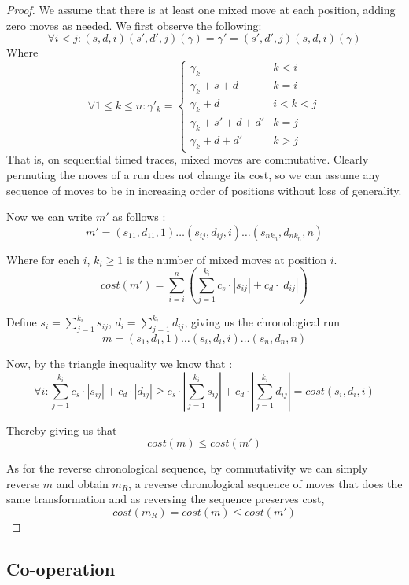 \documentclass[runningheads]{llncs}
\newcounter{cases}
\begin{document}
\begin{proof}
    We assume that there is at least one mixed move at each position, adding zero moves as needed. We first observe the following: 
    $$\forall  i < j : (s, d, i)(s', d', j)(\gamma) = \gamma' = (s', d', j)(s, d, i)(\gamma)$$
    Where $$\forall 1 \leq k \leq n : \gamma'_k = \begin{cases}
    \gamma_k & k <i \\
    \gamma_k + s + d & k = i \\
    \gamma_k + d & i < k < j \\
    \gamma_k + s' + d + d' & k = j \\
    \gamma_k + d + d' & k > j
    \end{cases}$$
    That is, on sequential timed traces, mixed moves are commutative. 
    Clearly permuting the moves of a run does not change its cost, so we can assume any sequence of moves to be in increasing order of positions without loss of generality.
    
    Now we can write $m'$ as follows : 
    $$m' = (s_{11}, d_{11}, 1)\dots (s_{ij}, d_{ij}, i)\dots(s_{nk_n}, d_{nk_n}, n)$$ 
    
    Where for each $i$, $k_i \geq 1$ is the number of mixed moves at position $i$. 
    $$cost(m') = \sum_{i = i}^{n} (\sum_{j = 1}^{k_i} c_s\cdot|s_{ij}| + c_d \cdot|d_{ij}|)$$ 
    
    Define $s_i = \sum_{j = 1}^{k_i} s_{ij}$, $d_i =\sum_{j = 1}^{k_i} d_{ij}$, giving us the chronological run $$m = (s_1, d_1, 1)\dots (s_i, d_i, i)\dots (s_n, d_n, n)$$
    
    Now, by the triangle inequality we know that : 
    $$\forall i : \sum_{j = 1}^{k_i} c_s \cdot|s_{ij}| + c_d \cdot|d_{ij}| \geq c_s \cdot| \sum_{j = 1}^{k_i} s_{ij} | + c_d \cdot| \sum_{j = 1}^{k_i} d_{ij} | = cost(s_i, d_i, i) $$
    
    Thereby giving us that $$cost(m) \leq cost(m')$$ 
    
    As for the reverse chronological sequence, by commutativity we can simply reverse $m$ and obtain $m_R$, a reverse chronological sequence of moves that does the same transformation and as reversing the sequence preserves cost, $$cost(m_R) = cost(m) \leq cost(m')$$ 
    \end{proof}
    
  \subsection{Co-operation}
    
\end{document}
